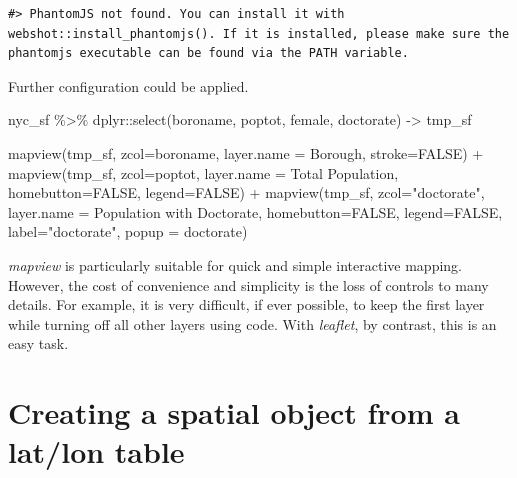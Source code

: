 \documentclass[
  11pt,
]{book}
\newenvironment{Shaded}{\begin{snugshade}}{\end{snugshade}}
\newcommand{\AttributeTok}[1]{\textcolor[rgb]{0.77,0.63,0.00}{#1}}
\newcommand{\ConstantTok}[1]{\textcolor[rgb]{0.00,0.00,0.00}{#1}}
\newcommand{\FunctionTok}[1]{\textcolor[rgb]{0.00,0.00,0.00}{#1}}
\newcommand{\NormalTok}[1]{#1}
\newcommand{\OtherTok}[1]{\textcolor[rgb]{0.56,0.35,0.01}{#1}}
\newcommand{\SpecialCharTok}[1]{\textcolor[rgb]{0.00,0.00,0.00}{#1}}
\newcommand{\StringTok}[1]{\textcolor[rgb]{0.31,0.60,0.02}{#1}}
\begin{document}
\begin{verbatim}
#> PhantomJS not found. You can install it with webshot::install_phantomjs(). If it is installed, please make sure the phantomjs executable can be found via the PATH variable.
\end{verbatim}

Further configuration could be applied.

\begin{Shaded}
\begin{Highlighting}[]
\NormalTok{nyc\_sf }\SpecialCharTok{\%\textgreater{}\%}\NormalTok{ dplyr}\SpecialCharTok{::}\FunctionTok{select}\NormalTok{(boroname, poptot, female, doctorate) }\OtherTok{{-}\textgreater{}}\NormalTok{ tmp\_sf}

\FunctionTok{mapview}\NormalTok{(tmp\_sf, }\AttributeTok{zcol=}\StringTok{\textquotesingle{}boroname\textquotesingle{}}\NormalTok{, }\AttributeTok{layer.name =} \StringTok{\textquotesingle{}Borough\textquotesingle{}}\NormalTok{, }\AttributeTok{stroke=}\ConstantTok{FALSE}\NormalTok{) }\SpecialCharTok{+} 
  \FunctionTok{mapview}\NormalTok{(tmp\_sf, }\AttributeTok{zcol=}\StringTok{\textquotesingle{}poptot\textquotesingle{}}\NormalTok{, }
          \AttributeTok{layer.name =} \StringTok{\textquotesingle{}Total Population\textquotesingle{}}\NormalTok{, }
          \AttributeTok{homebutton=}\ConstantTok{FALSE}\NormalTok{, }
          \AttributeTok{legend=}\ConstantTok{FALSE}\NormalTok{) }\SpecialCharTok{+}
  \FunctionTok{mapview}\NormalTok{(tmp\_sf, }\AttributeTok{zcol=}\StringTok{"doctorate"}\NormalTok{, }
          \AttributeTok{layer.name =} \StringTok{\textquotesingle{}Population with Doctorate\textquotesingle{}}\NormalTok{, }
          \AttributeTok{homebutton=}\ConstantTok{FALSE}\NormalTok{, }
          \AttributeTok{legend=}\ConstantTok{FALSE}\NormalTok{, }
          \AttributeTok{label=}\StringTok{"doctorate"}\NormalTok{,}
          \AttributeTok{popup =} \StringTok{\textquotesingle{}doctorate\textquotesingle{}}\NormalTok{)}
\end{Highlighting}
\end{Shaded}

\emph{mapview} is particularly suitable for quick and simple interactive mapping. However, the cost of convenience and simplicity is the loss of controls to many details. For example, it is very difficult, if ever possible, to keep the first layer while turning off all other layers using code. With \emph{leaflet}, by contrast, this is an easy task.

\hypertarget{creating-a-spatial-object-from-a-latlon-table}{%
\section{Creating a spatial object from a lat/lon table}\label{creating-a-spatial-object-from-a-latlon-table}}
\end{document}
